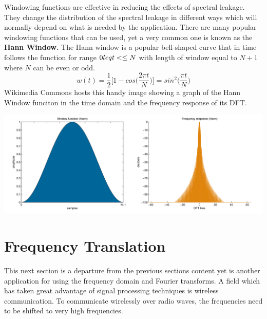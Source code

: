 \documentclass[12pt]{article}
\begin{document}
Windowing functions are effective in reducing the effects of spectral leakage. They change the distribution of the spectral leakage in different ways which will normally depend on what is needed by the application. There are many popular windowing functions that can be used, yet a very common one is known as the \textbf{Hann Window.} The Hann window is a popular bell-shaped curve that in time follows the function for range $0 \\leq t < \leq N $ with length of window equal to $N+1$ where $N$ can be even or odd. $$w(t) = \frac{1}{2} \bigg[ 1 - cos \bigg( \frac{2\pi t}{N} \bigg) \bigg] = sin^2 \bigg(\frac{\pi t}{N} \bigg) $$ 
Wikimedia Commons hosts this handy image showing a graph of the Hann Window funciton in the time domain and the frequency response of its DFT. 
\begin{center}
\includegraphics[scale=0.3]{hann_window}
\end{center}



\section*{Frequency Translation}
This next section is a departure from the previous sections content yet is another application for using the frequency domain and Fourier transforms. A field which has taken great advantage of signal processing techniques is wireless communication. To communicate wirelessly over radio waves, the frequencies need to be shifted to very high frequencies.
\end{document}
